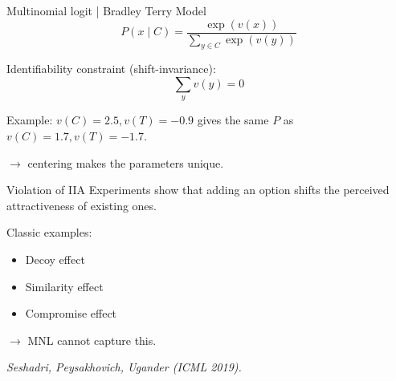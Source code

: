 \documentclass[aspectratio=169]{beamer}
\begin{document}
\begin{frame}{Multinomial logit | Bradley Terry Model}
    \begin{equation*}
        P(x \mid C) = \frac{\exp(v(x))}{\sum_{y \in C} \exp(v(y))}
    \end{equation*}

    \vspace{0.5em}

    Identifiability constraint (shift-invariance):
    \begin{equation*}
        \sum_y v(y) = 0
    \end{equation*}

    \vspace{0.5em}

    Example: $v(C) = 2.5, v(T) = -0.9$ gives the same $P$ as
    $v(C) = 1.7, v(T) = -1.7$.

    \vspace{0.3em}

    $\rightarrow$ centering makes the parameters unique.
\end{frame}

\begin{frame}{Violation of IIA}
    Experiments show that adding an option shifts the perceived
    attractiveness of existing ones.

    \vspace{1em}

    Classic examples:
    \begin{itemize}
        \item Decoy effect
        \item Similarity effect
        \item Compromise effect
    \end{itemize}

    \vspace{1em}

    $\rightarrow$ MNL cannot capture this.

    \vspace{0.3em}
    \small
    \textit{Seshadri, Peysakhovich, Ugander (ICML 2019).}
\end{frame}
\end{document}

